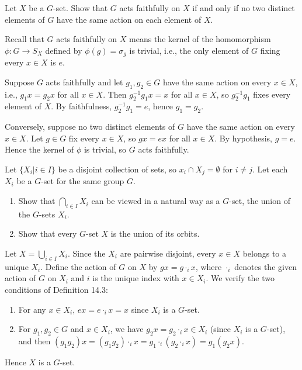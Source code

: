 \begin{problem}[14.19]
  Let $X$ be a $G$-set. Show that $G$ acts faithfully on $X$ if and only if no two distinct elements of $G$ have the same action on each element of $X$.
\end{problem}

\begin{solution}
  Recall that $G$ acts faithfully on $X$ means the kernel of the homomorphism $\phi : G \to S_X$ defined by $\phi(g) = \sigma_g$ is trivial, i.e., the only element of $G$ fixing every $x \in X$ is $e$.

  Suppose $G$ acts faithfully and let $g_1, g_2 \in G$ have the same action on every $x \in X$, i.e., $g_1 x = g_2 x$ for all $x \in X$. Then $g_2^{-1}g_1 x = x$ for all $x \in X$, so $g_2^{-1}g_1$ fixes every element of $X$. By faithfulness, $g_2^{-1}g_1 = e$, hence $g_1 = g_2$.

  Conversely, suppose no two distinct elements of $G$ have the same action on every $x \in X$. Let $g \in G$ fix every $x \in X$, so $gx = ex$ for all $x \in X$. By hypothesis, $g = e$. Hence the kernel of $\phi$ is trivial, so $G$ acts faithfully.
\end{solution}

\begin{problem}[14.22]
  Let $\{X_i | i \in I\}$ be a disjoint collection of sets, so $x_i \cap X_j = \emptyset$ for $i \ne j$. Let each $X_i$ be a $G$-set for the same group $G$.
  \begin{enumerate}
    \item Show that $\bigcap_{i\in I} X_i$ can be viewed in a natural way as a $G$-set, the union of the $G$-sets $X_i$.
    \item Show that every $G$-set $X$ is the union of its orbits.
  \end{enumerate}
\end{problem}

\begin{solution}[(i)]
  Let $X = \bigcup_{i \in I} X_i$. Since the $X_i$ are pairwise disjoint, every $x \in X$ belongs to a unique $X_i$. Define the action of $G$ on $X$ by $gx = g \cdot_i x$, where $\cdot_i$ denotes the given action of $G$ on $X_i$ and $i$ is the unique index with $x \in X_i$. We verify the two conditions of Definition 14.3:
  \begin{enumerate}
    \item For any $x \in X_i$, $ex = e \cdot_i x = x$ since $X_i$ is a $G$-set.
    \item For $g_1, g_2 \in G$ and $x \in X_i$, we have $g_2 x = g_2 \cdot_i x \in X_i$ (since $X_i$ is a $G$-set), and then $(g_1g_2)x = (g_1g_2) \cdot_i x = g_1 \cdot_i (g_2 \cdot_i x) = g_1(g_2 x)$.
  \end{enumerate}
  Hence $X$ is a $G$-set.
\end{solution}

